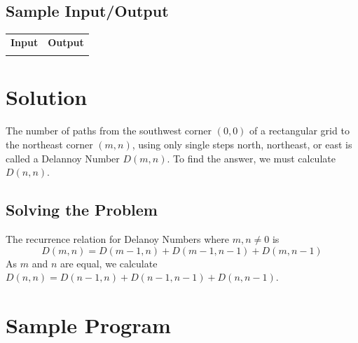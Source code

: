 \documentclass[12pt]{report}
\begin{document}
  \subsection*{Sample Input/Output}
  \begin{tabular}{ |l|l| } 
    \hline
    \textbf{Input} & \textbf{Output} \\
    {} & {} \\ %
    \hline
   \end{tabular}


  \section*{Solution}
  The number of paths from the southwest corner $(0, 0)$ of a rectangular grid to the northeast corner $(m, n)$, using only single steps north, northeast, or east is called a Delannoy Number $D(m,n)$. To find the answer, we must calculate $D(n,n)$.
  \subsection*{Solving the Problem}
  The recurrence relation for Delanoy Numbers where $m,n\neq0$ is
  $$D(m,n)=D(m-1,n)+D(m-1,n-1)+D(m,n-1)$$
  As $m$ and $n$ are equal, we calculate $D(n,n)=D(n-1,n)+D(n-1,n-1)+D(n,n-1)$.

	\section*{Sample Program}
	
	
\end{document}
